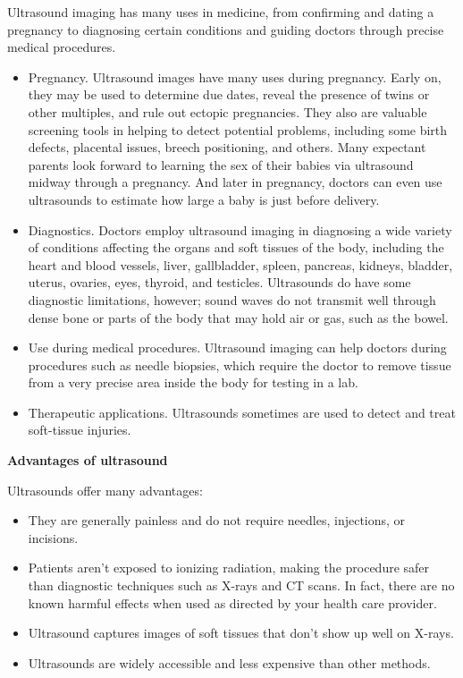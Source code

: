 \documentclass[12pt]{article}
\begin{document}
\large\flushleft Ultrasound imaging has many uses in medicine, from confirming and dating a pregnancy to diagnosing certain conditions and guiding doctors through precise medical procedures.
\begin{itemize}


\item Pregnancy. Ultrasound images have many uses during pregnancy. Early on, they may be used to determine due dates, reveal the presence of twins or other multiples, and rule out ectopic pregnancies. They also are valuable screening tools in helping to detect potential problems, including some birth defects, placental issues, breech positioning, and others. Many expectant parents look forward to learning the sex of their babies via ultrasound midway through a pregnancy. And later in pregnancy, doctors can even use ultrasounds to estimate how large a baby is just before delivery.

\item Diagnostics. Doctors employ ultrasound imaging in diagnosing a wide variety of conditions affecting the organs and soft tissues of the body, including the heart and blood vessels, liver, gallbladder, spleen, pancreas, kidneys, bladder, uterus, ovaries, eyes, thyroid, and testicles. Ultrasounds do have some diagnostic limitations, however; sound waves do not transmit well through dense bone or parts of the body that may hold air or gas, such as the bowel.


\item Use during medical procedures. Ultrasound imaging can help doctors during procedures such as needle biopsies, which require the doctor to remove tissue from a very precise area inside the body for testing in a lab.

\item Therapeutic applications. Ultrasounds sometimes are used to detect and treat soft-tissue injuries.


\end{itemize}

\LARGE\flushleft\textbf{Advantages of ultrasound}

\large\flushleft Ultrasounds offer many advantages:
\begin{itemize}

\item They are generally painless and do not require needles, injections, or incisions.
\item Patients aren't exposed to ionizing radiation, making the procedure safer than diagnostic techniques such as X-rays and CT scans. In fact, there are no known harmful effects when used as directed by your health care provider.
\item Ultrasound captures images of soft tissues that don't show up well on X-rays.
\item Ultrasounds are widely accessible and less expensive than other methods.
\end{itemize}
\end{document}
